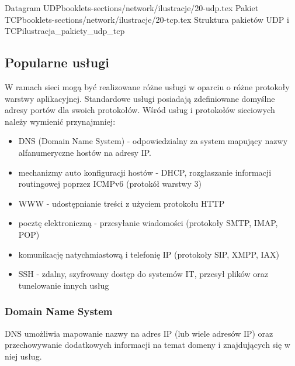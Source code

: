 	{Datagram UDP}{booklets-sections/network/ilustracje/20-udp.tex}
	{Pakiet TCP}{booklets-sections/network/ilustracje/20-tcp.tex}
	{Struktura pakietów UDP i TCP}{ilustracja_pakiety_udp_tcp}

\subsection{Popularne usługi}

W ramach sieci mogą być realizowane różne usługi w oparciu o różne protokoły warstwy aplikacyjnej. Standardowe usługi posiadają zdefiniowane domyślne adresy portów dla swoich protokołów. Wśród usług i protokołów sieciowych należy wymienić przynajmniej:
\begin{itemize}
	\item DNS (Domain Name System) - odpowiedzialny za system mapujący nazwy alfanumeryczne hostów na adresy IP.
	\item mechanizmy auto konfiguracji hostów - DHCP, rozgłaszanie informacji routingowej poprzez ICMPv6 (protokół warstwy 3)
	\item WWW - udostępnianie treści z użyciem protokołu HTTP
	\item pocztę elektroniczną - przesyłanie wiadomości (protokoły SMTP, IMAP, POP)
	\item komunikację natychmiastową i telefonię IP (protokoły SIP, XMPP, IAX)
	\item SSH - zdalny, szyfrowany dostęp do systemów IT, przesył plików oraz tunelowanie innych usług
\end{itemize}

\subsubsection{Domain Name System}

DNS umożliwia mapowanie nazwy na adres IP (lub wiele adresów IP) oraz przechowywanie dodatkowych informacji na temat domeny i znajdujących się w niej usług.

